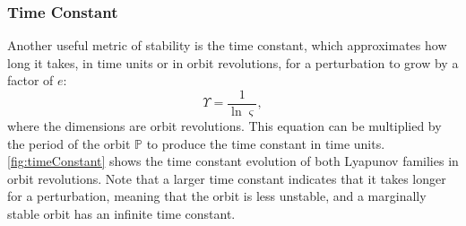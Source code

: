 \subsubsection{Time Constant}
Another useful metric of stability is the time constant, which approximates how long it takes, in
time units or in orbit revolutions, for a perturbation to grow by a factor of $e$:
\begin{equation}
    \Upsilon=\frac{1}{\ln\varsigma},
    \label{eq:timeconstant}
\end{equation}
where the dimensions are orbit revolutions. This equation can be multiplied by the period of the
orbit $\mathbb{P}$ to produce the time constant in time units. \cref{fig:timeConstant} shows the
time constant evolution of both Lyapunov families in orbit revolutions. Note that a larger time
constant indicates that it takes longer for a perturbation, meaning that the orbit is less
unstable, and a marginally stable orbit has an infinite time constant.

